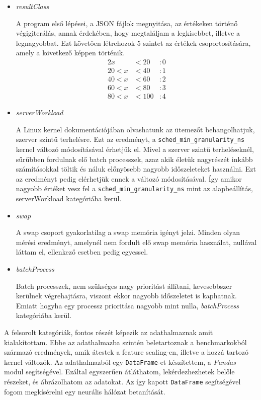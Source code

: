 \begin{itemize}
\item \textit{resultClass}

A program első lépései, a JSON fájlok megnyitása, az értékeken történő végigiterálás, annak érdekében, hogy megtaláljam a legkisebbet, illetve a legnagyobbat. Ezt követően létrehozok 5 szintet az értékek csoportosítására, amely a következő képpen történik.
\begin{alignat*}{2}
         x& < 20 &: 0 \\
    20 < x& < 40 &: 1 \\
    40 < x& < 60 &: 2 \\
    60 < x& < 80 &: 3 \\
    80 < x& < 100&: 4
\end{alignat*}


\item \textit{serverWorkload}

A Linux kernel dokumentációjában olvashatunk az ütemezőt behangolhatjuk, szerver szintű terhelésre. Ezt az eredményt, a \texttt{sched\_min\_granularity\_ns} kernel változó módosításával érhetjük el.
Mivel a szerver szintű terheléseknél, sűrűbben fordulnak elő batch processzek, azaz akik életük nagyrészét inkább számításokkal töltik és náluk előnyösebb nagyobb időszeleteket használni. Ezt az eredményt pedig elérhetjük ennek a változó módosításával. Így amikor nagyobb értéket vesz fel a \texttt{sched\_min\_granularity\_ns} mint az alapbeállítás, serverWorkload kategóriába kerül.
\item \textit{swap} 

A swap csoport gyakorlatilag a swap memória igényt jelzi. 
Minden olyan mérési eredményt, amelynél nem fordult elő swap memória használat, nullával láttam el, ellenkező esetben pedig egyessel.
\item \textit{batchProcess}

Batch processzek, nem szükséges nagy prioritást állítani, kevesebbszer kerülnek végrehajtásra, viszont ekkor nagyobb időszeletet is kaphatnak. Emiatt hogyha egy processz prioritása nagyobb mint nulla, \textit{batchProcess} kategóriába kerül.
\end{itemize}

A felsorolt kategóriák, fontos részét képezik az adathalmaznak amit kialakítottam. Ebbe az adathalmazba szintén beletartoznak a benchmarkokból származó eredmények, amik átestek a feature scaling-en, illetve a hozzá tartozó kernel változók. Az adathalmazból egy \texttt{DataFrame}-et készítettem, a \textit{Pandas} modul segítségével. Ezáltal egyszerűen átláthatom, lekérdezhezhetek belőle részeket, és ábrázolhatom az adatokat.
Az így kapott \texttt{DataFrame} segítségével fogom megkísérelni egy neurális hálózat betanítását. 

